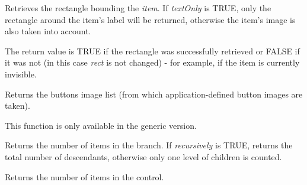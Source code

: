 \label{wxtreelistctrlgetitemrect}


Retrieves the rectangle bounding the {\it item}. If {\it textOnly} is TRUE,
only the rectangle around the item's label will be returned, otherwise the
item's image is also taken into account.

The return value is TRUE if the rectangle was successfully retrieved or FALSE
if it was not (in this case {\it rect} is not changed) - for example, if the
item is currently invisible.



\label{wxtreelistctrlgetbuttonsimagelist}


Returns the buttons image list (from which application-defined button images are taken).

This function is only available in the generic version.

\label{wxtreelistctrlgetchildrencount}


Returns the number of items in the branch. If {\it recursively} is TRUE, returns the total number
of descendants, otherwise only one level of children is counted.

\label{wxtreelistctrlgetcount}


Returns the number of items in the control.

\label{wxtreelistctrlgetfirstchild}


